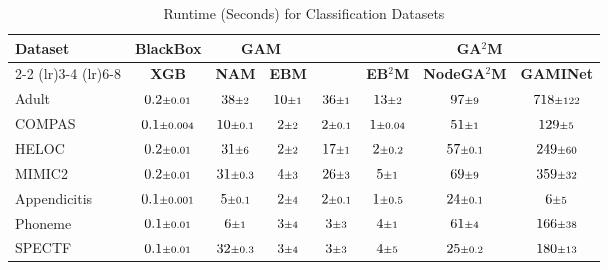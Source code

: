 \begin{table}[htbp]
\caption{Runtime (Seconds) for Classification Datasets}
\label{tab:clf-time-def}
\centering
\small
\begin{tabular}{lccccccc}
\toprule
\textbf{Dataset} & \multicolumn{1}{c}{\textbf{BlackBox}} & \multicolumn{2}{c}{\textbf{GAM}} & \multicolumn{1}{c}{\textbf{\method{}}} & \multicolumn{3}{c}{\textbf{GA$^2$M}} \\
\cmidrule(lr){2-2} \cmidrule(lr){3-4}  \cmidrule(lr){6-8}
& \textbf{XGB} & \textbf{NAM} & \textbf{EBM} &   & \textbf{EB$^2$M} & \textbf{NodeGA$^2$M} & \textbf{GAMINet} \\
\midrule
Adult & $0.2 \text{\scriptsize$\pm$0.01}$ & $38 \text{\scriptsize$\pm$2}$ & $10 \text{\scriptsize$\pm$1}$ & $36 \text{\scriptsize$\pm$1}$ & $13 \text{\scriptsize$\pm$2}$ & $97 \text{\scriptsize$\pm$9}$ & $718 \text{\scriptsize$\pm$122}$ \\
COMPAS & $0.1 \text{\scriptsize$\pm$0.004}$ & $10 \text{\scriptsize$\pm$0.1}$ & $2 \text{\scriptsize$\pm$2}$ & $2 \text{\scriptsize$\pm$0.1}$ & $1 \text{\scriptsize$\pm$0.04}$ & $51 \text{\scriptsize$\pm$1}$ & $129 \text{\scriptsize$\pm$5}$ \\
HELOC & $0.2 \text{\scriptsize$\pm$0.01}$ & $31 \text{\scriptsize$\pm$6}$ & $2 \text{\scriptsize$\pm$2}$ & $17 \text{\scriptsize$\pm$1}$ & $2 \text{\scriptsize$\pm$0.2}$ & $57 \text{\scriptsize$\pm$0.1}$ & $249 \text{\scriptsize$\pm$60}$ \\
MIMIC2 & $0.2 \text{\scriptsize$\pm$0.01}$ & $31 \text{\scriptsize$\pm$0.3}$ & $4 \text{\scriptsize$\pm$3}$ & $26 \text{\scriptsize$\pm$3}$ & $5 \text{\scriptsize$\pm$1}$ & $69 \text{\scriptsize$\pm$9}$ & $359 \text{\scriptsize$\pm$32}$ \\
Appendicitis & $0.1 \text{\scriptsize$\pm$0.001}$ & $5 \text{\scriptsize$\pm$0.1}$ & $2 \text{\scriptsize$\pm$4}$ & $2 \text{\scriptsize$\pm$0.1}$ & $1 \text{\scriptsize$\pm$0.5}$ & $24 \text{\scriptsize$\pm$0.1}$ & $6 \text{\scriptsize$\pm$5}$ \\
Phoneme & $0.1 \text{\scriptsize$\pm$0.01}$ & $6 \text{\scriptsize$\pm$1}$ & $3 \text{\scriptsize$\pm$4}$ & $3 \text{\scriptsize$\pm$3}$ & $4 \text{\scriptsize$\pm$1}$ & $61 \text{\scriptsize$\pm$4}$ & $166 \text{\scriptsize$\pm$38}$ \\
SPECTF & $0.1 \text{\scriptsize$\pm$0.01}$ & $32 \text{\scriptsize$\pm$0.3}$ & $3 \text{\scriptsize$\pm$4}$ & $3 \text{\scriptsize$\pm$3}$ & $4 \text{\scriptsize$\pm$5}$ & $25 \text{\scriptsize$\pm$0.2}$ & $180 \text{\scriptsize$\pm$13}$ \\

\end{tabular}
\end{table}
